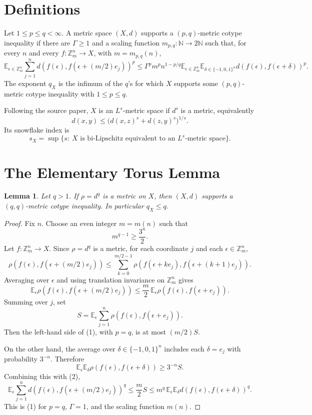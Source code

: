 \documentclass[11pt]{article}
\newtheorem{lemma}{Lemma}
\newcommand{\Z}{\mathbb Z}
\newcommand{\E}{\mathbb E}
\begin{document}
\section*{Definitions}

Let \(1\le p\le q<\infty\). A metric space \((X,d)\) supports a
\((p,q)\)-metric cotype inequality if there are \(\Gamma\ge1\) and a scaling
function \(m_{p,q}:\mathbb N\to 2\mathbb N\) such that, for every \(n\) and
every \(f:\Z_m^n\to X\), with \(m=m_{p,q}(n)\),
\[
\E_{\epsilon\in\Z_m^n}\sum_{j=1}^n
d(f(\epsilon),f(\epsilon+(m/2)e_j))^p
\le
\Gamma^p m^p n^{1-p/q}
\E_{\epsilon\in\Z_m^n}\E_{\delta\in\{-1,0,1\}^n}
d(f(\epsilon),f(\epsilon+\delta))^p .
\tag{1}
\]
The exponent \(q_X\) is the infimum of the \(q\)'s for which \(X\) supports
some \((p,q)\)-metric cotype inequality with \(1\le p\le q\).

Following the source paper, \(X\) is an \(L^s\)-metric space if \(d^s\) is a
metric, equivalently
\[
d(x,y)\le \bigl(d(x,z)^s+d(z,y)^s\bigr)^{1/s}.
\]
Its snowflake index is
\[
s_X=\sup\{s:\ X\text{ is bi-Lipschitz equivalent to an }L^s\text{-metric space}\}.
\]

\section*{The Elementary Torus Lemma}

\begin{lemma}
Let \(q>1\). If \(\rho=d^q\) is a metric on \(X\), then \((X,d)\) supports a
\((q,q)\)-metric cotype inequality. In particular \(q_X\le q\).
\end{lemma}

\begin{proof}
Fix \(n\). Choose an even integer \(m=m(n)\) such that
\[
m^{q-1}\ge \frac{3^n}{2}.
\tag{2}
\]
Let \(f:\Z_m^n\to X\). Since \(\rho=d^q\) is a metric, for each coordinate
\(j\) and each \(\epsilon\in\Z_m^n\),
\[
\rho(f(\epsilon),f(\epsilon+(m/2)e_j))
\le
\sum_{k=0}^{m/2-1}
\rho(f(\epsilon+k e_j),f(\epsilon+(k+1)e_j)).
\]
Averaging over \(\epsilon\) and using translation invariance on \(\Z_m^n\)
gives
\[
\E_\epsilon \rho(f(\epsilon),f(\epsilon+(m/2)e_j))
\le
\frac m2\,\E_\epsilon \rho(f(\epsilon),f(\epsilon+e_j)).
\]
Summing over \(j\), set
\[
S=\E_\epsilon\sum_{j=1}^n \rho(f(\epsilon),f(\epsilon+e_j)).
\]
Then the left-hand side of (1), with \(p=q\), is at most \((m/2)S\).

On the other hand, the average over \(\delta\in\{-1,0,1\}^n\) includes each
\(\delta=e_j\) with probability \(3^{-n}\). Therefore
\[
\E_\epsilon\E_\delta \rho(f(\epsilon),f(\epsilon+\delta))
\ge
3^{-n}S.
\]
Combining this with (2),
\[
\E_\epsilon\sum_{j=1}^n d(f(\epsilon),f(\epsilon+(m/2)e_j))^q
\le
\frac m2 S
\le
m^q\,\E_\epsilon\E_\delta d(f(\epsilon),f(\epsilon+\delta))^q.
\]
This is (1) for \(p=q\), \(\Gamma=1\), and the scaling function \(m(n)\).
\end{proof}
\end{document}
